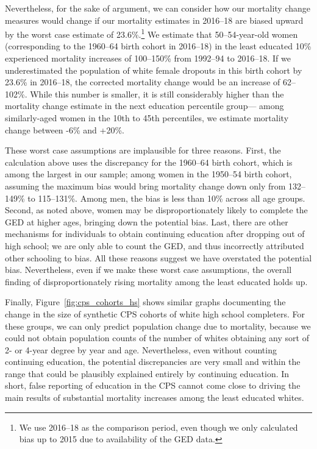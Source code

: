 Nevertheless, for the sake of argument, we can consider how our mortality change measures would change if our mortality estimates in 2016--18 are biased upward by the worst case estimate of 23.6\%.\footnote{We use 2016--18 as the comparison period, even though we only calculated bias up to 2015 due to availability of the GED data.}  We estimate that 50--54-year-old women (corresponding to the 1960--64 birth cohort in 2016--18) in the least educated 10\% experienced mortality increases of 100--150\% from 1992--94 to 2016--18. If we underestimated the population of white female dropouts in this birth cohort by 23.6\% in 2016--18, the corrected mortality change would be an increase of 62--102\%. While this number is smaller, it is still considerably higher than the mortality change estimate in the next education percentile group--- among similarly-aged women in the 10th to 45th percentiles, we estimate mortality change between -6\% and +20\%.

These worst case assumptions are implausible for three reasons. First, the calculation above uses the discrepancy for the 1960--64 birth cohort, which is among the largest in our sample; among women in the 1950--54 birth cohort, assuming the maximum bias would bring mortality change down only from 132--149\% to 115--131\%. Among men, the bias is less than 10\% across all age groups. Second, as noted above, women may be disproportionately likely to complete the GED at higher ages, bringing down the potential bias. Last, there are other mechanisms for individuals to obtain continuing education after dropping out of high school; we are only able to count the GED, and thus incorrectly attributed other schooling to bias. All these reasons suggest we have overstated the potential bias. Nevertheless, even if we make these worst case assumptions, the overall finding of disproportionately rising mortality among the least educated holds up.

Finally, Figure~\ref{fig:cps_cohorts_hs} shows similar graphs documenting the change in the size of synthetic CPS cohorts of white high school completers. For these groups, we can only predict population change due to mortality, because we could not obtain population counts of the number of whites obtaining any sort of 2- or 4-year degree by year and age. Nevertheless, even without counting continuing education, the potential discrepancies are very small and within the range that could be plausibly explained entirely by continuing education. In short, false reporting of education in the CPS cannot come close to driving the main results of substantial mortality increases among the least educated whites.

